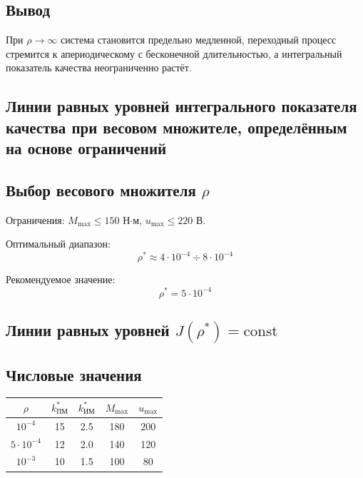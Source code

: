 \documentclass[14pt]{extreport}
\begin{document}
{\subsection*{Вывод}
При $\rho \to \infty$ система становится предельно медленной, переходный процесс стремится к апериодическому с бесконечной длительностью, а интегральный показатель качества неограниченно растёт.

        \subsection{Линии равных уровней интегрального показателя качества при весовом множителе, определённым на основе ограничений}
        \subsection*{Выбор весового множителя $\rho$}
Ограничения: $M_{\text{max}} \leq 150$ Н$\cdot$м, $u_{\text{max}} \leq 220$ В.

Оптимальный диапазон:
\[
\rho^* \approx 4\cdot10^{-4} \div 8\cdot10^{-4}
\]

Рекомендуемое значение:
\[
\boxed{\rho^* = 5\cdot10^{-4}}
\]

\subsection*{Линии равных уровней $J(\rho^*) = \text{const}$}
\begin{center}
\end{center}

\subsection*{Числовые значения}
\begin{table}[h]
\centering
\begin{tabular}{|c|c|c|c|c|}
\hline
$\rho$ & $k_{\text{ПМ}}^*$ & $k_{\text{ИМ}}^*$ & $M_{\text{max}}$ & $u_{\text{max}}$ \\
\hline
$10^{-4}$ & 15 & 2.5 & 180 & 200 \\
$5\cdot10^{-4}$ & 12 & 2.0 & 140 & 120 \\
$10^{-3}$ & 10 & 1.5 & 100 & 80 \\
\hline
\end{tabular}
\end{table}

}
\end{document}
